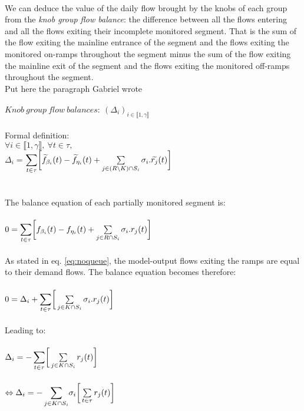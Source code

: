 \\
We can deduce the value of the daily flow brought by the knobs of each group from the \emph{knob group flow balance}: the difference between all the flows entering and all the flows exiting their incomplete monitored segment. That is the sum of the flow exiting the mainline entrance of the segment and the flows exiting the monitored on-ramps throughout the segment minus the sum of the flow exiting the mainline exit of the segment and the flows exiting the monitored off-ramps throughout the segment. \\ 
\color{red}Put here the paragraph Gabriel wrote\color{black}\\
\\
$Knob\ group\ flow\ balances:\ (\Delta_{i})_{i\in \llbracket 1,\gamma \rrbracket} $\\
\\
Formal definition:\\
$\forall i \in \llbracket 1,\gamma \rrbracket,\ \forall t\in \tau,$\\
$\Delta_{i} =$\small $\mathlarger{\sum\limits_{t\in \tau}}\bigg[\widetilde{f}_{\beta_{i}}(t)-\widetilde{f}_{\eta_{i}}(t)+\sum\limits_{j\in (R\backslash K)\cap S_{i}}\sigma_{i}.\widetilde{r_{j}}(t)\bigg]$\normalsize 
\\
\\
\\
The balance equation of each partially monitored segment is:\\
\\
$0=\mathlarger{\sum\limits_{t\in \tau}}\bigg[f_{\beta_{i}}(t)-f_{\eta_{i}}(t)+\sum\limits_{j\in R\cap S_{i}}\sigma_{i}.r_{j}(t)\bigg]$\\
\\
As stated in eq. \ref{eq:noqueue}, the model-output flows exiting the ramps are equal to their demand flows. The balance equation becomes therefore:\\
\\
$0=\Delta_{i}+\mathlarger{\sum\limits_{t\in \tau}}\bigg[\sum\limits_{j\in K\cap S_{i}}\sigma_{i}.r_{j}(t)\bigg]$\\
\\
Leading to:\\
\\
$\Delta_{i}=\mathlarger{-\sum\limits_{t\in \tau}}\bigg[\sum\limits_{j\in K\cap S_{i}}r_{j}(t)\bigg]$\\
\\
$\Leftrightarrow \Delta_{i}=\mathlarger{-\sum\limits_{j\in K\cap S_{i}}}\sigma_{i}\bigg[\sum\limits_{t\in \tau}r_{j}(t)\bigg]$\\

